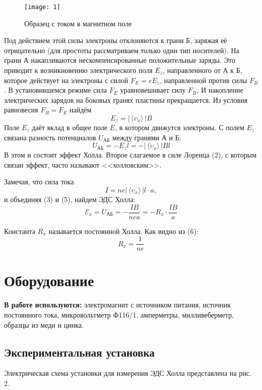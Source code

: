 \begin{wrapfigure}{l}{0.4\linewidth}
    \texttt{[image: 1]}
    \captionsetup{justification=centering}
    \caption{Образец с током в магнитном
    поле}
\end{wrapfigure}

Под действием этой силы электроны
отклоняются к грани Б, заряжая её
отрицательно (для простоты рассматриваем
только один тип носителей). На грани А
накапливаются нескомпенсированные
положительные заряды. Это приводит к
возникновению электрического поля $E_z$,
направленного от А к Б, которое
действует на электроны с силой $F_E =
eE_z$,
направленной против силы $F_B$. В
установившемся режиме сила $F_E$ 
уравновешивает силу $F_B$, И накопление
электрических зарядов на боковых гранях
пластины прекращается. Из условия
равновесия $F_B = F_E$ найдём
\begin{equation}
    E_z = |\, \langle \upsilon_x \rangle
    \, | B
\end{equation}
Поле $E_z$ даёт вклад в общее поле $E$, в
котором движутся электроны. С полем $E_z$ 
связана разность потенциалов
$U_{\text{АБ}}$ между
гранями А и Б:
\begin{equation}
    U_{\text{АБ}} = -E_z l = -
    |\,\langle \upsilon_x \rangle \, | B
    l
\end{equation}
В этом и состоит эффект Холла. Второе
слагаемое в силе Лоренца (2), с
которым связан эффект, часто называют
<<холловским>>.

Замечая, что сила тока
\begin{equation}
    I = ne| \, \langle \upsilon_x
    \rangle \, | l\cdot a,
\end{equation}
и объединяя (3) и (5), найдем ЭДС
Холла:
\begin{equation}
    \mathscr{E}_x = U_\text{АБ} = -
    \frac{IB}{nea} = -R_x \cdot
    \frac{IB}{a}
\end{equation}

Константа $R_x$ называется постоянной
Холла. Как видно из (6):
\[
R_x = \frac{1}{ne}
\]

\section{Оборудование}

\textbf{В работе используются:}
электромагнит с источником питания,
источник постоянного тока,
микровольтметр Ф116/1, амперметры,
милливеберметр, образцы из меди
и цинка.

\subsection*{Экспериментальная установка}
Электрическая схема установки для
измерения ЭДС Холла представлена на рис.
2.

